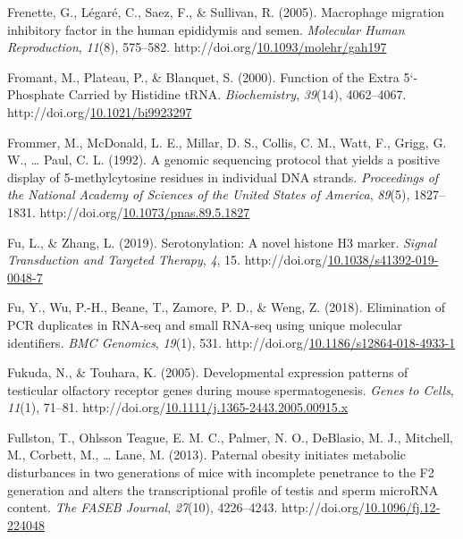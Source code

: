 \documentclass[12pt,twoside]{reedthesis}
\newlength{\cslhangindent}
\newenvironment{CSLReferences}[2] %
 {%
  \setlength{\parindent}{0pt}
  \ifodd #1 \everypar{\setlength{\hangindent}{\cslhangindent}}\ignorespaces\fi
  \ifnum #2 > 0
  \setlength{\parskip}{#2\baselineskip}
  \fi
 }%
 {}
\begin{document}
\begin{CSLReferences}{1}{0}
\leavevmode{}%
Frenette, G., Légaré, C., Saez, F., \& Sullivan, R. (2005). Macrophage migration inhibitory factor in the human epididymis and semen. \emph{Molecular Human Reproduction}, \emph{11}(8), 575--582. http://doi.org/\href{https://doi.org/10.1093/molehr/gah197}{10.1093/molehr/gah197}

\leavevmode{}%
Fromant, M., Plateau, P., \& Blanquet, S. (2000). Function of the Extra 5{`}-Phosphate Carried by Histidine tRNA. \emph{Biochemistry}, \emph{39}(14), 4062--4067. http://doi.org/\href{https://doi.org/10.1021/bi9923297}{10.1021/bi9923297}

\leavevmode{}%
Frommer, M., McDonald, L. E., Millar, D. S., Collis, C. M., Watt, F., Grigg, G. W., \ldots{} Paul, C. L. (1992). A genomic sequencing protocol that yields a positive display of 5-methylcytosine residues in individual DNA strands. \emph{Proceedings of the National Academy of Sciences of the United States of America}, \emph{89}(5), 1827--1831. http://doi.org/\href{https://doi.org/10.1073/pnas.89.5.1827}{10.1073/pnas.89.5.1827}

\leavevmode{}%
Fu, L., \& Zhang, L. (2019). Serotonylation: A novel histone H3 marker. \emph{Signal Transduction and Targeted Therapy}, \emph{4}, 15. http://doi.org/\href{https://doi.org/10.1038/s41392-019-0048-7}{10.1038/s41392-019-0048-7}

\leavevmode{}%
Fu, Y., Wu, P.-H., Beane, T., Zamore, P. D., \& Weng, Z. (2018). Elimination of PCR duplicates in RNA-seq and small RNA-seq using unique molecular identifiers. \emph{BMC Genomics}, \emph{19}(1), 531. http://doi.org/\href{https://doi.org/10.1186/s12864-018-4933-1}{10.1186/s12864-018-4933-1}

\leavevmode{}%
Fukuda, N., \& Touhara, K. (2005). Developmental expression patterns of testicular olfactory receptor genes during mouse spermatogenesis. \emph{Genes to Cells}, \emph{11}(1), 71--81. http://doi.org/\href{https://doi.org/10.1111/j.1365-2443.2005.00915.x}{10.1111/j.1365-2443.2005.00915.x}

\leavevmode{}%
Fullston, T., Ohlsson Teague, E. M. C., Palmer, N. O., DeBlasio, M. J., Mitchell, M., Corbett, M., \ldots{} Lane, M. (2013). Paternal obesity initiates metabolic disturbances in two generations of mice with incomplete penetrance to the F2 generation and alters the transcriptional profile of testis and sperm microRNA content. \emph{The FASEB Journal}, \emph{27}(10), 4226--4243. http://doi.org/\href{https://doi.org/10.1096/fj.12-224048}{10.1096/fj.12-224048}


\end{CSLReferences}
\end{document}
